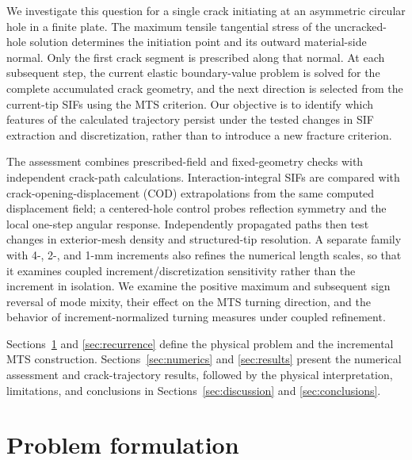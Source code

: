 \documentclass[11pt]{article}
\begin{document}
We investigate this question for a single crack initiating
at an asymmetric circular hole in a finite plate. The maximum
tensile tangential stress of the uncracked-hole solution determines
the initiation point and its outward material-side normal.
Only the first crack segment is prescribed along that normal.
At each subsequent step, the current elastic boundary-value
problem is solved for the complete accumulated crack geometry,
and the next direction is selected from the current-tip SIFs
using the MTS criterion. Our objective is to identify which features of the
calculated trajectory persist under the tested changes
in SIF extraction and discretization, rather than
to introduce a new fracture criterion.

\begingroup
\setlength{\emergencystretch}{1em}
The assessment combines prescribed-field and fixed-geometry
checks with independent crack-path calculations. Interaction-integral
SIFs are compared with crack-opening-displacement (COD)
extrapolations from the same computed displacement field; a
centered-hole control probes reflection symmetry and the local
one-step angular response. Independently propagated paths
then test changes in exterior-mesh density and structured-tip
resolution. A separate family with 4-, 2-, and 1-mm increments
also refines the numerical length scales, so that it examines
coupled increment/discretization sensitivity rather than the
increment in isolation. We examine the positive maximum and subsequent sign reversal
of mode mixity, their effect on the MTS turning direction,
and the behavior of increment-normalized turning measures
under coupled refinement.
\par\endgroup

Sections~\ref{sec:problem} and \ref{sec:recurrence} define the
physical problem and the incremental MTS construction.
Sections~\ref{sec:numerics} and \ref{sec:results} present the
numerical assessment and crack-trajectory results, followed
by the physical interpretation, limitations, and conclusions
in Sections~\ref{sec:discussion} and \ref{sec:conclusions}.

\section{Problem formulation}
\label{sec:problem}
\end{document}
